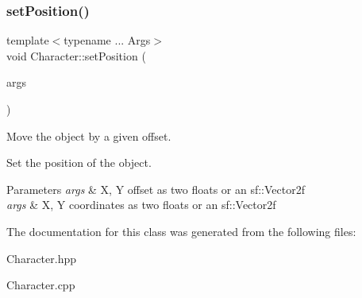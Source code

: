 \subsubsection{\texorpdfstring{set\+Position()}{setPosition()}}
{\footnotesize\ttfamily template$<$typename ... Args$>$ \\
void Character\+::set\+Position (\begin{DoxyParamCaption}\item[{Args \&\&...}]{args }\end{DoxyParamCaption})\hspace{0.3cm}{\ttfamily [inline]}}



Move the object by a given offset. 

Set the position of the object.


\begin{DoxyParams}{Parameters}
{\em args} & X, Y offset as two floats or an sf\+::\+Vector2f\\
\hline
{\em args} & X, Y coordinates as two floats or an sf\+::\+Vector2f \\
\hline
\end{DoxyParams}


The documentation for this class was generated from the following files\+:\begin{DoxyCompactItemize}
\item 
Character.\+hpp\item 
Character.\+cpp\end{DoxyCompactItemize}
